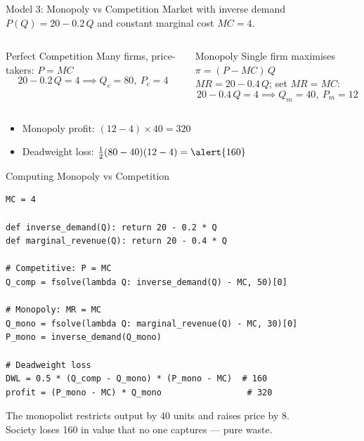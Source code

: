 \documentclass[aspectratio=169, 10pt]{beamer}
\begin{document}
\begin{frame}{Model 3: Monopoly vs Competition}
Market with inverse demand $P(Q) = 20 - 0.2\,Q$ and constant
marginal cost $MC = 4$.
\vspace{0.5em}
\begin{columns}[T]
\begin{block}{Perfect Competition}
Many firms, price-takers: $P = MC$
\[
  20 - 0.2\,Q = 4 \implies Q_c = 80,\ P_c = 4
\]
\end{block}
\begin{block}{Monopoly}
Single firm maximises $\pi = (P - MC)\,Q$\\
$MR = 20 - 0.4\,Q$; set $MR = MC$:
\[
  20 - 0.4\,Q = 4 \implies Q_m = 40,\ P_m = 12
\]
\end{block}
\end{columns}
\vspace{0.5em}
\begin{itemize}
  \item Monopoly profit: $(12 - 4)\times 40 = 320$
  \item Deadweight loss: $\tfrac{1}{2}(80 - 40)(12 - 4) = \alert{160}$
\end{itemize}
\end{frame}

\begin{frame}[fragile]{Computing Monopoly vs Competition}
\begin{lstlisting}
MC = 4

def inverse_demand(Q): return 20 - 0.2 * Q
def marginal_revenue(Q): return 20 - 0.4 * Q

# Competitive: P = MC
Q_comp = fsolve(lambda Q: inverse_demand(Q) - MC, 50)[0]

# Monopoly: MR = MC
Q_mono = fsolve(lambda Q: marginal_revenue(Q) - MC, 30)[0]
P_mono = inverse_demand(Q_mono)

# Deadweight loss
DWL = 0.5 * (Q_comp - Q_mono) * (P_mono - MC)  # 160
profit = (P_mono - MC) * Q_mono                 # 320
\end{lstlisting}
\vspace{0.3em}
The monopolist restricts output by 40 units and raises price by 8.\\
Society loses 160 in value that \alert{no one captures} --- pure waste.
\end{frame}
\end{document}
